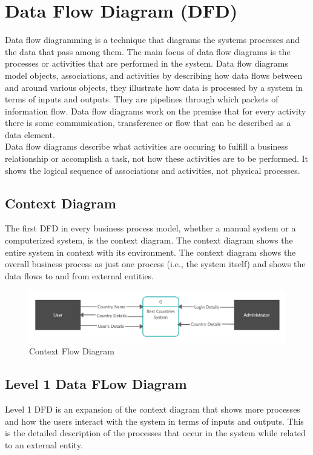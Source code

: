 \documentclass[twoside, a4paper, 12pt]{report}
\begin{document}
\section{Data Flow Diagram (DFD)}
Data flow diagramming is a technique that diagrams the systems processes and the data that pass among them. The main focus of data flow diagrams is the processes or activities that are performed in the system. Data flow diagrams model objects, associations, and activities by describing how data flows between and around various objects, they illustrate how data is processed by a system in terms of inputs and outputs. They are pipelines through which packets of information flow. Data flow diagrams work on the premise that for every activity there is some communication, transference or flow that can be described as a data element.\\
\indent
Data flow diagrams describe what activities are occuring to fulfill a business relationship or accomplish a task, not how these activities are to be performed. It shows the logical sequence of associations and activities, not physical processes.

\subsection{Context Diagram}
The first DFD in every business process model, whether a manual system or a computerized system, is the context diagram. The context diagram shows the entire system in context with its environment. The context diagram shows the overall business process as just one process (i.e., the system itself) and shows the data flows to and from external entities.

\begin{figure} [ht]
	\centering
	\includegraphics[width=1.0\textwidth]{CFD.png}
	\caption{Context Flow Diagram}
	\label{fig:context-flow-diagram}
\end{figure}

\subsection{Level 1 Data FLow Diagram}
Level 1 DFD is an expansion of the context diagram that shows more processes and how the users interact with the system in terms of inputs and outputs. This is the detailed description of the processes that occur in the system while related to an external entity.
\end{document}
